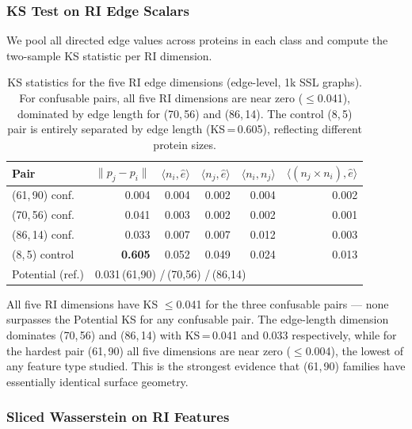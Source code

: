 \subsubsection{KS Test on RI Edge Scalars}
\label{sec:analysis:ri:ks}

We pool all directed edge values across proteins in each class and compute the
two-sample KS statistic per RI dimension.

\begin{table}[ht]
  \centering
  \caption{KS statistics for the five RI edge dimensions (edge-level, 1k SSL
           graphs).
           For confusable pairs, all five RI dimensions are near zero
           ($\leq$0.041), dominated by edge length for (70,\,56) and (86,\,14).
           The control (8,\,5) pair is entirely separated by edge length
           (KS\,=\,0.605), reflecting different protein sizes.}
  \label{tab:ks_ri}
  \begin{tabular}{lrrrrr}
    \toprule
    \textbf{Pair}
      & $\|p_j{-}p_i\|$
      & $\langle n_i,\hat{e}\rangle$
      & $\langle n_j,\hat{e}\rangle$
      & $\langle n_i,n_j\rangle$
      & $\langle (n_j{\times}n_i),\hat{e}\rangle$ \\
    \midrule
    (61,\,90) conf. & 0.004 & 0.004 & 0.002 & 0.004 & 0.002 \\
    (70,\,56) conf. & 0.041 & 0.003 & 0.002 & 0.002 & 0.001 \\
    (86,\,14) conf. & 0.033 & 0.007 & 0.007 & 0.012 & 0.003 \\
    (8,\,5) control & \textbf{0.605} & 0.052 & 0.049 & 0.024 & 0.013 \\
    \midrule
    Potential (ref.) & \multicolumn{5}{l}{0.031\,(61,90) \;/\; 0.192\,(70,56) \;/\; 0.250\,(86,14)} \\
    \bottomrule
  \end{tabular}
\end{table}

All five RI dimensions have KS $\leq$0.041 for the three confusable pairs
--- none surpasses the Potential KS for any confusable pair.
The edge-length dimension dominates (70,\,56) and (86,\,14) with KS\,=\,0.041
and 0.033 respectively, while for the hardest pair (61,\,90) all five dimensions
are near zero ($\leq$0.004), the lowest of any feature type studied.
This is the strongest evidence that (61,\,90) families have essentially identical
surface geometry.

\subsubsection{Sliced Wasserstein on RI Features}

